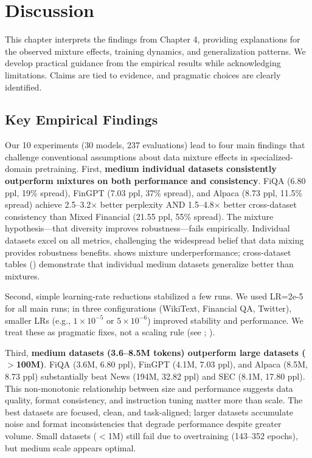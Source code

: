 \chapter{Discussion}

This chapter interprets the findings from Chapter 4, providing explanations for the observed mixture effects, training dynamics, and generalization patterns. We develop practical guidance from the empirical results while acknowledging limitations. Claims are tied to evidence, and pragmatic choices are clearly identified.

\section{Key Empirical Findings}

Our 10 experiments (30 models, 237 evaluations) lead to four main findings that challenge conventional assumptions about data mixture effects in specialized-domain pretraining. First, \textbf{medium individual datasets consistently outperform mixtures on both performance and consistency}. FiQA (6.80 ppl, 19\% spread), FinGPT (7.03 ppl, 37\% spread), and Alpaca (8.73 ppl, 11.5\% spread) achieve 2.5–3.2$\times$ better perplexity AND 1.5–4.8$\times$ better cross-dataset consistency than Mixed Financial (21.55 ppl, 55\% spread). The mixture hypothesis—that diversity improves robustness—fails empirically. Individual datasets excel on all metrics, challenging the widespread belief that data mixing provides robustness benefits.  shows mixture underperformance; cross-dataset tables () demonstrate that individual medium datasets generalize better than mixtures.

Second, simple learning‑rate reductions stabilized a few runs. We used LR=2e‑5 for all main runs; in three configurations (WikiText, Financial QA, Twitter), smaller LRs (e.g., $1\times10^{-5}$ or $5\times10^{-6}$) improved stability and performance. We treat these as pragmatic fixes, not a scaling rule (see ; ).

Third, \textbf{medium datasets (3.6–8.5M tokens) outperform large datasets ($>$100M)}. FiQA (3.6M, 6.80 ppl), FinGPT (4.1M, 7.03 ppl), and Alpaca (8.5M, 8.73 ppl) substantially beat News (194M, 32.82 ppl) and SEC (8.1M, 17.80 ppl). This non-monotonic relationship between size and performance suggests data quality, format consistency, and instruction tuning matter more than scale. The best datasets are focused, clean, and task-aligned; larger datasets accumulate noise and format inconsistencies that degrade performance despite greater volume. Small datasets ($<$1M) still fail due to overtraining (143–352 epochs), but medium scale appears optimal.

